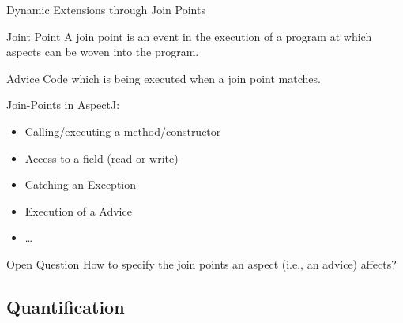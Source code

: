\begin{frame}{Dynamic Extensions through Join Points}
	\begin{mycolumns}[animation=none]
		\begin{definition}{Joint Point }
			A join point is an event in the execution of a program at which aspects can be woven into the program.
		\end{definition}
		\begin{definition}{Advice}
			Code which is being executed when a join point matches. 
		\end{definition}
		\begin{definition}{Join-Points in AspectJ:}
			\begin{itemize}
				\item Calling/executing a method/constructor
				\item Access to a field (read or write)
				\item Catching an Exception
				\item Execution of a Advice
				\item \ldots
			\end{itemize}
		\end{definition}
	\mynextcolumn
		\begin{exampletight}{}
			\centering
		\end{exampletight}
		\pause
		\begin{note}{Open Question}		
			How to specify the join points an aspect (i.e., an advice) affects?
		\end{note}
	\end{mycolumns}
\end{frame}

\subsection{Quantification}


